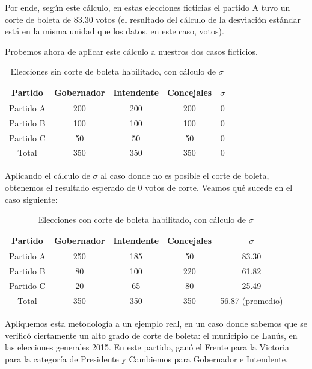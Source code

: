 \documentclass[12pt,a4paper]{article}
\begin{document}
Por ende, según este cálculo, en estas elecciones ficticias el partido A tuvo un
corte de boleta de 83.30 votos (el resultado del cálculo de la desviación
estándar está en la misma unidad que los datos, en este caso, votos).

Probemos ahora de aplicar este cálculo a nuestros dos casos ficticios.

\renewcommand{\arraystretch}{1.25}
\begin{table}[h!]
\centering
\begin{tabular}{c c c c c} 
 Partido & Gobernador & Intendente & Concejales & \(\sigma\) \\ [0.5ex] 
 \hline
Partido A & 200 & 200 & 200 & 0 \\
Partido B & 100 & 100 & 100 & 0 \\
Partido C & 50 & 50 & 50 & 0 \\
 \hline
Total & 350 & 350 & 350 & 0 \\ [1ex]
 \hline
\end{tabular}
\caption{Elecciones sin corte de boleta habilitado, con cálculo de \(\sigma\)}
\label{table:1}
\end{table}

\pagebreak

Aplicando el cálculo de $\sigma$ al caso donde no es posible el corte de boleta,
obtenemos el resultado esperado de 0 votos de corte. Veamos qué sucede en el
caso siguiente:

\renewcommand{\arraystretch}{1.25}
\begin{table}[h!]
\centering
\begin{tabular}{c c c c c} 
 Partido & Gobernador & Intendente & Concejales & $\sigma$ \\ [0.5ex] 
 \hline
Partido A & 250 & 185 & 50 & 83.30 \\
Partido B & 80 & 100 & 220 & 61.82 \\
Partido C & 20 & 65 & 80 & 25.49 \\
 \hline
Total & 350 & 350 & 350 & 56.87 (promedio) \\ [1ex]
 \hline
\end{tabular}
\caption{Elecciones con corte de boleta habilitado, con cálculo de $\sigma$}
\label{table:1}
\end{table}

Apliquemos esta metodología a un ejemplo real, en un caso donde sabemos que se verificó
ciertamente un alto grado de corte de boleta: el municipio de Lanús, en las
elecciones generales 2015. En este partido, ganó el Frente para la Victoria para
la categoría de Presidente y Cambiemos para Gobernador e Intendente.
\end{document}
